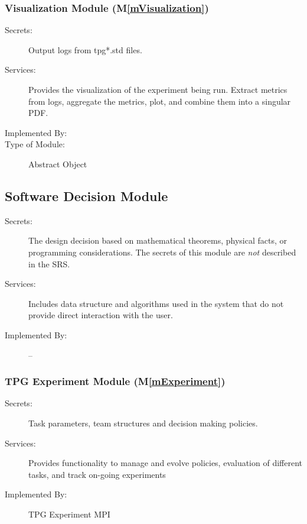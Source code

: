 \documentclass[12pt, titlepage]{article}
\newcommand{\mref}[1]{M\ref{#1}}
\begin{document}
\subsubsection{Visualization Module (\mref{mVisualization})}

\begin{description}
\item[Secrets:]Output logs from tpg*.std files.
\item[Services:]Provides the visualization of the experiment being run. Extract metrics from logs, aggregate the metrics, plot, and combine them into a singular PDF.
\item[Implemented By:] \progname{}
\item[Type of Module:] Abstract Object
\end{description}



\subsection{Software Decision Module}

\begin{description}
\item[Secrets:] The design decision based on mathematical theorems, physical
  facts, or programming considerations. The secrets of this module are
  \emph{not} described in the SRS.
\item[Services:] Includes data structure and algorithms used in the system that
  do not provide direct interaction with the user. 
\item[Implemented By:] --
\end{description}

\subsubsection{TPG Experiment Module (\mref{mExperiment})}
\begin{description}
  \item[Secrets:] Task parameters, team structures and decision making policies.
  \item[Services:] Provides functionality to manage and evolve policies, evaluation of different tasks, and track on-going experiments
  \item[Implemented By:] TPG Experiment MPI
  \end{description}
\end{document}
